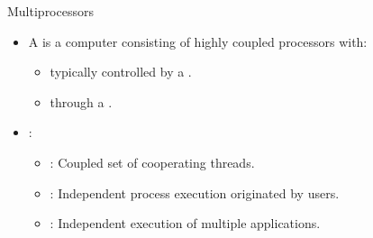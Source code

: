 \begin{frame}[t]{Multiprocessors}
\begin{itemize}
  \item A  is a computer consisting of highly coupled
        processors with:
    \begin{itemize}
      \item \pause{} typically controlled by a
            .
      \item {} through a
            .
    \end{itemize}

  \item {}:
    \begin{itemize}
      \item \pause{}: 
            Coupled set of cooperating threads.
      \item \pause{}: 
            Independent process execution originated by users.
            
      \item \pause{}: 
            Independent execution of multiple applications.
    \end{itemize}

\end{itemize}
\end{frame}


